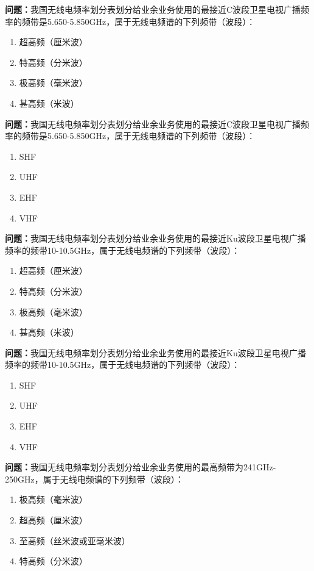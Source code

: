 \bigskip


\noindent\textbf{问题：}我国无线电频率划分表划分给业余业务使用的最接近C波段卫星电视广播频率的频带是5.650-5.850GHz，属于无线电频谱的下列频带（波段）：
\begin{enumerate}[label=\Alph*), leftmargin=3em]
\item 超高频（厘米波）
\item 特高频（分米波）
\item 极高频（毫米波）
\item 甚高频（米波）
\end{enumerate}

\bigskip


\noindent\textbf{问题：}我国无线电频率划分表划分给业余业务使用的最接近C波段卫星电视广播频率的频带是5.650-5.850GHz，属于无线电频谱的下列频带（波段）：
\begin{enumerate}[label=\Alph*), leftmargin=3em]
\item SHF
\item UHF
\item EHF
\item VHF
\end{enumerate}

\bigskip


\noindent\textbf{问题：}我国无线电频率划分表划分给业余业务使用的最接近Ku波段卫星电视广播频率的频带10-10.5GHz，属于无线电频谱的下列频带（波段）：
\begin{enumerate}[label=\Alph*), leftmargin=3em]
\item 超高频（厘米波）
\item 特高频（分米波）
\item 极高频（毫米波）
\item 甚高频（米波）
\end{enumerate}

\bigskip


\noindent\textbf{问题：}我国无线电频率划分表划分给业余业务使用的最接近Ku波段卫星电视广播频率的频带10-10.5GHz，属于无线电频谱的下列频带（波段）：
\begin{enumerate}[label=\Alph*), leftmargin=3em]
\item SHF
\item UHF
\item EHF
\item VHF
\end{enumerate}

\bigskip


\noindent\textbf{问题：}我国无线电频率划分表划分给业余业务使用的最高频带为241GHz-250GHz，属于无线电频谱的下列频带（波段）：
\begin{enumerate}[label=\Alph*), leftmargin=3em]
\item 极高频（毫米波）
\item 超高频（厘米波）
\item 至高频（丝米波或亚毫米波）
\item 特高频（分米波）
\end{enumerate}

